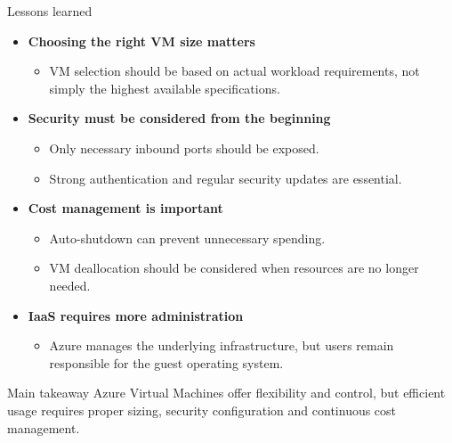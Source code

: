 \documentclass[aspectratio=169,xcolor=dvipsnames]{beamer}
\begin{document}
	
	\begin{frame}{Lessons learned}
		\begin{itemize}
			\item \textbf{Choosing the right VM size matters}
			\begin{itemize}
				\item VM selection should be based on actual workload requirements,
				not simply the highest available specifications.
			\end{itemize}
			
			\item \textbf{Security must be considered from the beginning}
			\begin{itemize}
				\item Only necessary inbound ports should be exposed.
				\item Strong authentication and regular security updates are essential.
			\end{itemize}
			
			\item \textbf{Cost management is important}
			\begin{itemize}
				\item Auto-shutdown can prevent unnecessary spending.
				\item VM deallocation should be considered when resources are no longer needed.
			\end{itemize}
			
			\item \textbf{IaaS requires more administration}
			\begin{itemize}
				\item Azure manages the underlying infrastructure,
				but users remain responsible for the guest operating system.
			\end{itemize}
		\end{itemize}
		
		\vspace{0.3cm}
		\begin{block}{Main takeaway}
			Azure Virtual Machines offer flexibility and control,
			but efficient usage requires proper sizing, security
			configuration and continuous cost management.
		\end{block}
	\end{frame}
	
\end{document}

